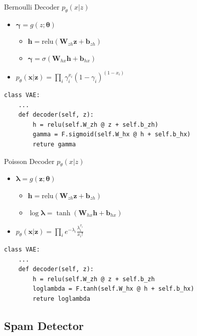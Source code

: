 \documentclass{beamer}
\newcommand{\relu}{\mathrm{relu}}
\begin{document}
\begin{frame}[fragile]{Bernoulli Decoder $p_\theta(x|z)$}
\begin{itemize}
	\item $\bm{\gamma}=g(z;\bm{\theta})$
	\begin{itemize}
		\item $\mathbf{h} = \relu\left(\mathbf{W}_{zh}\mathbf{z}+\mathbf{b}_{zh}\right)$
		\item $\bm{\gamma} = \sigma\left(\mathbf{W}_{hx}\mathbf{h}+\mathbf{b}_{hx}\right)$
	\end{itemize}
	\item $p_\theta(\mathbf{x}|\mathbf{z})=\prod_i\gamma_i^{x_i}(1-\gamma_i)^{(1-x_i)}$
\end{itemize}
\begin{verbatim}
class VAE:
    ...
    def decoder(self, z):
        h = relu(self.W_zh @ z + self.b_zh)  
        gamma = F.sigmoid(self.W_hx @ h + self.b_hx)      
        reture gamma
\end{verbatim}
\end{frame}

\begin{frame}[fragile]{Poisson Decoder $p_\theta(x|z)$}
\begin{itemize}
	\item $\bm{\lambda}=g(\mathbf{z};\bm{\theta})$
	\begin{itemize}
		\item $\mathbf{h} = \relu\left(\mathbf{W}_{zh}\mathbf{z}+\mathbf{b}_{zh}\right)$
		\item $\log\bm{\lambda} = \tanh\left(\mathbf{W}_{hx}\mathbf{h}+\mathbf{b}_{hx}\right)$
	\end{itemize}
	\item $p_\theta(\mathbf{x}|\mathbf{z})=\prod_i e^{-\lambda_i}\frac{\lambda_i^{x_i}}{x_i!}$
\end{itemize}
\begin{verbatim}
class VAE:
    ...
    def decoder(self, z):
        h = relu(self.W_zh @ z + self.b_zh  
        loglambda = F.tanh(self.W_hx @ h + self.b_hx)
        reture loglambda
\end{verbatim}
\end{frame}

\subsection{Spam Detector}
\end{document}
